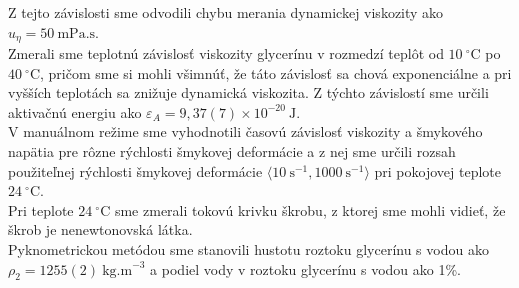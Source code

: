 \documentclass{prepareprotokol} %
\begin{document}
Z tejto závislosti sme odvodili chybu merania dynamickej viskozity ako $u_{\eta}= 50~\mathrm{mPa.s}$.\\

Zmerali sme teplotnú závislosť viskozity glycerínu v rozmedzí teplôt od $10~^\circ \mathrm{C}$ po  $40~^\circ \mathrm{C}$, pričom sme si mohli všimnúť, že táto závislosť sa chová exponenciálne a pri vyšších teplotách sa znižuje dynamická viskozita. Z týchto závislostí sme určili aktivačnú energiu ako $\varepsilon_A = 9,37(7)\times10^{-20}~\mathrm{J}$.\\

V manuálnom režime sme vyhodnotili časovú závislosť viskozity a šmykového napätia pre rôzne rýchlosti šmykovej deformácie a z nej sme určili rozsah použiteľnej rýchlosti šmykovej deformácie $\langle 10~\mathrm{s}^{-1}, 1000~\mathrm{s}^{-1}\rangle$ pri pokojovej teplote $24~^\circ \mathrm{C}$.\\

Pri teplote $24~^\circ \mathrm{C}$ sme zmerali tokovú krivku škrobu, z ktorej sme mohli vidieť, že škrob je nenewtonovská látka.\\

Pyknometrickou metódou sme stanovili hustotu roztoku glycerínu s vodou ako $\rho_2 = 1255(2)~\mathrm{kg.m}^{-3}$ a podiel vody v roztoku glycerínu s vodou ako 1\%.
\end{document}
